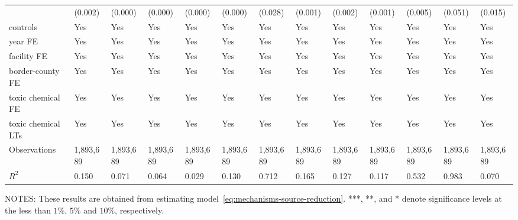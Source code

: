 \begin{table}[H]
{\begin{tabular}{@{}lllllllllllll@{}}
            & (0.002)    & (0.000)             & (0.000)                & (0.000)         & (0.000)      & (0.028)    & (0.001)   & (0.002)   & (0.001)       & (0.005)  & (0.051)    & (0.015)  \\
            controls           & Yes        & Yes                 & Yes                    & Yes             & Yes          & Yes        & Yes       & Yes       & Yes           & Yes           & Yes                    & Yes       \\
            year FE            & Yes        & Yes                 & Yes                    & Yes             & Yes          & Yes        & Yes       & Yes       & Yes           & Yes           & Yes                    & Yes       \\
            facility FE        & Yes        & Yes                 & Yes                    & Yes             & Yes          & Yes        & Yes       & Yes       & Yes           & Yes           & Yes                    & Yes       \\
            border-county FE   & Yes        & Yes                 & Yes                    & Yes             & Yes          & Yes        & Yes       & Yes       & Yes           & Yes           & Yes                    & Yes       \\
            toxic chemical FE  & Yes        & Yes                 & Yes                    & Yes             & Yes          & Yes        & Yes       & Yes       & Yes           & Yes           & Yes                    & Yes       \\
            toxic chemical LTs & Yes        & Yes                 & Yes                    & Yes             & Yes          & Yes        & Yes       & Yes       & Yes           & Yes           & Yes                    & Yes       \\\midrule
            Observations       & 1,893,689  & 1,893,689           & 1,893,689              & 1,893,689       & 1,893,689    & 1,893,689  & 1,893,689 & 1,893,689 & 1,893,689     & 1,893,689  & 1,893,689  & 1,893,689 \\
            $R^2$              & 0.150      & 0.071               & 0.064                  & 0.029           & 0.130        & 0.712      & 0.165     & 0.127     & 0.117         & 0.532         & 0.983                  & 0.070     \\ \bottomrule\bottomrule
        \end{tabular}%
    }
    \begin{minipage}{\columnwidth}
        \vspace{0.05in}
        \tiny NOTES: These results are obtained from estimating model~\ref{eq:mechanisms-source-reduction}. ***, **, and * denote significance levels at the less than $1\%$, $5\%$ and $10\%$, respectively.
    \end{minipage}
\end{table}